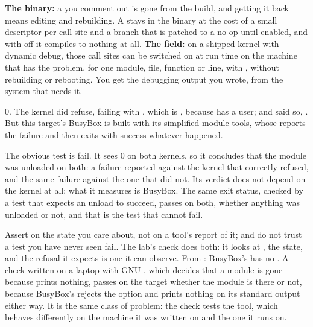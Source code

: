 \textbf{The binary:} a  you comment out is gone from the build, and getting
it back means editing and rebuilding. A  stays in the binary at the cost of a small
descriptor per call site and a branch that is patched to a no-op until enabled, and with
 off it compiles to nothing at all. \textbf{The field:} on a shipped
kernel with dynamic debug, those call sites can be switched on at run time on the machine that has
the problem, for one module, file, function or line, with , without rebuilding or rebooting. You get the debugging
output you wrote, from the system that needs it.


 0. The kernel did refuse,  failing with , which is
, because  has a user; and  said so, . But this target's BusyBox is built with its
simplified module tools, whose  reports the failure and then exits with success
whatever happened.

 The obvious test is  fail. It sees 0 on both kernels, so
it concludes that the module was unloaded on both: a failure reported against the kernel that
correctly refused, and the same failure against the one that did not. Its verdict does not depend on
the kernel at all; what it measures is BusyBox. The same exit status, checked by a test that
expects an unload to succeed, passes on both, whether anything was unloaded or not, and that is
the test that cannot fail.

 Assert on the state you care about, not on a tool's report of it; and do not trust a
test you have never seen fail. The lab's check does both: it looks at , the state, and
the refusal it expects is one it can observe. From : BusyBox's  has no
. A check written on a laptop with GNU , which decides that a module is
gone because  prints nothing, passes on the target
whether the module is there or not, because BusyBox's  rejects the option and prints
nothing on its standard output either way. It is the same class of problem: the check tests the
tool, which behaves differently on the machine it was written on and the one it runs on.

